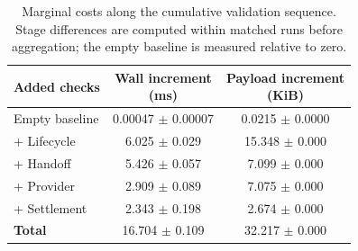 \begin{table}[!t]
\centering
\caption{Marginal costs along the cumulative validation sequence. Stage differences are computed within matched runs before aggregation; the empty baseline is measured relative to zero.}
\label{tab:f-paired-increments}
\footnotesize
\renewcommand{\arraystretch}{1.08}
\setlength{\tabcolsep}{3pt}
\begin{tabular*}{\columnwidth}{@{\hspace{3pt}}l@{\extracolsep{\fill}}cc@{\hspace{3pt}}}
\toprule
\textbf{Added checks} & \shortstack{\textbf{Wall increment}\\\textbf{(ms)}} & \shortstack{\textbf{Payload increment}\\\textbf{(KiB)}} \\
\midrule
Empty baseline & 0.00047 $\pm$ 0.00007 & 0.0215 $\pm$ 0.0000 \\
+ Lifecycle & 6.025 $\pm$ 0.029 & 15.348 $\pm$ 0.000 \\
+ Handoff & 5.426 $\pm$ 0.057 & 7.099 $\pm$ 0.000 \\
+ Provider & 2.909 $\pm$ 0.089 & 7.075 $\pm$ 0.000 \\
+ Settlement & 2.343 $\pm$ 0.198 & 2.674 $\pm$ 0.000 \\
\textbf{Total} & 16.704 $\pm$ 0.109 & 32.217 $\pm$ 0.000 \\
\bottomrule
\end{tabular*}
\end{table}

